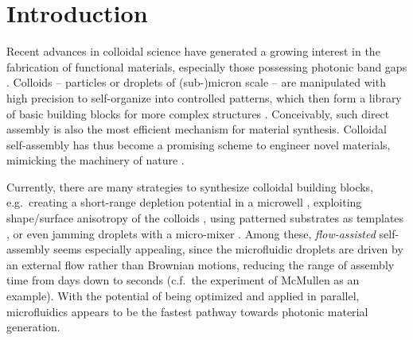 





\section{Introduction}

Recent advances in colloidal science have generated a growing interest in the fabrication of functional materials, especially those possessing photonic band gaps \cite{PRL1990, PBM1999, ZnO2003, colloidal2003, Shen_2016AS}. Colloids --  particles or droplets of (sub-)micron scale -- are manipulated with high precision to self-organize into controlled patterns, which then form a library of basic building blocks for more complex structures \cite{Sacanna_Pine_2011}. Conceivably, such direct assembly is also the most efficient mechanism for material synthesis. Colloidal self-assembly has thus become a promising scheme to engineer novel materials, mimicking the machinery of nature \cite{vanBlaaderen}. 

Currently, there are many strategies to synthesize colloidal building blocks, e.g.\ creating a short-range depletion potential in a microwell \cite{Meng2010}, exploiting shape/surface anisotropy of the colloids \cite{Sacanna_Pine_2011, Evers2016}, using patterned substrates as templates \cite{Yin2001}, or even jamming droplets with a micro-mixer \cite{Joshua_2017PRL}. Among these, \textit{flow-assisted} self-assembly seems especially appealing, since the microfluidic droplets are driven by an external flow rather than Brownian motions, reducing the range of assembly time from days down to seconds (c.f.\ the experiment of McMullen \etal \cite{McMullen2018} as an example). With the potential of being optimized and applied in parallel, microfluidics appears to be the fastest pathway towards photonic material generation.

